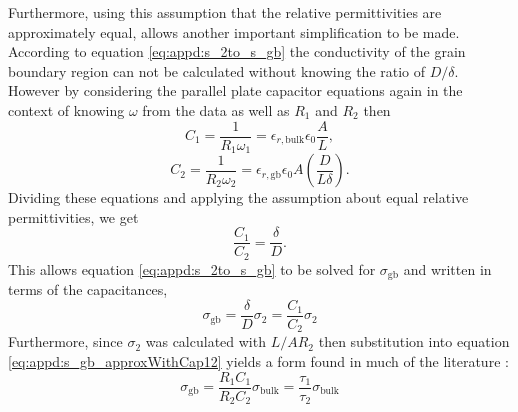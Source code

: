 Furthermore, using this assumption that the relative permittivities are approximately equal, allows another important simplification to be made. According to equation \ref{eq:appd:s_2to_s_gb} the conductivity of the grain boundary region can not be calculated without knowing the ratio of $D/\delta$. However by considering the parallel plate capacitor equations again in the context of knowing $\omega$ from the data as well as $R_1$ and $R_2$ then
\begin{equation*}
    C_1 = \frac{1}{R_1 \omega_1} = \epsilon_{r, \mathrm{bulk}} \epsilon_0 \frac{A}{L},
\end{equation*}
\begin{equation*}
    C_2 = \frac{1}{R_2 \omega_2} = \epsilon_{r, \mathrm{gb}} \epsilon_0 A \left(\frac{D}{L \delta}\right).
\end{equation*}
Dividing these equations and applying the assumption about equal relative permittivities, we get
\begin{equation}
    \frac{C_1}{C_2} = \frac{\delta}{D}.    
\end{equation}
This allows equation \ref{eq:appd:s_2to_s_gb} to be solved for $\sigma_{\mathrm{gb}}$ and written in terms of the capacitances,
\begin{equation}
    \sigma_{\mathrm{gb}} = \frac{\delta}{D} \sigma_2 = \frac{C_1}{C_2} \sigma_2
    \label{eq:appd:s_gb_approxWithCap12}
\end{equation}
Furthermore, since $\sigma_2$ was calculated with $L/AR_2$ then substitution into equation \ref{eq:appd:s_gb_approxWithCap12} yields a form found in much of the literature \cite{Gilardi2017}:
\begin{equation}
    \sigma_{\mathrm{gb}} = \frac{R_1 C_1}{R_2 C_2} \sigma_{\mathrm{bulk}} = \frac{\tau_1}{\tau_2}\sigma_{\mathrm{bulk}}
\end{equation}














